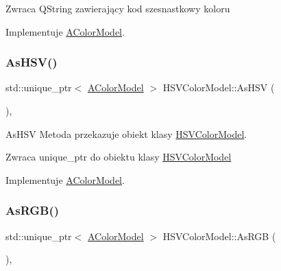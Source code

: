 \begin{DoxyReturn}{Zwraca}
Q\+String zawierający kod szesnastkowy koloru 
\end{DoxyReturn}


Implementuje \mbox{\hyperlink{class_a_color_model}{A\+Color\+Model}}.

\mbox{\label{class_h_s_v_color_model_a4f15c9e48f157f7bd83f5a0837f1ac87}} 
\subsubsection{\texorpdfstring{As\+H\+S\+V()}{AsHSV()}}
{\footnotesize\ttfamily std\+::unique\+\_\+ptr$<$ \mbox{\hyperlink{class_a_color_model}{A\+Color\+Model}} $>$ H\+S\+V\+Color\+Model\+::\+As\+H\+SV (\begin{DoxyParamCaption}{ }\end{DoxyParamCaption})\hspace{0.3cm}{\ttfamily [override]}, {\ttfamily [virtual]}}



As\+H\+SV Metoda przekazuje obiekt klasy \mbox{\hyperlink{class_h_s_v_color_model}{H\+S\+V\+Color\+Model}}. 

\begin{DoxyReturn}{Zwraca}
unique\+\_\+ptr do obiektu klasy \mbox{\hyperlink{class_h_s_v_color_model}{H\+S\+V\+Color\+Model}} 
\end{DoxyReturn}


Implementuje \mbox{\hyperlink{class_a_color_model}{A\+Color\+Model}}.

\mbox{\label{class_h_s_v_color_model_a576aa9888f81248c99e67da6bb0587d2}} 
\subsubsection{\texorpdfstring{As\+R\+G\+B()}{AsRGB()}}
{\footnotesize\ttfamily std\+::unique\+\_\+ptr$<$ \mbox{\hyperlink{class_a_color_model}{A\+Color\+Model}} $>$ H\+S\+V\+Color\+Model\+::\+As\+R\+GB (\begin{DoxyParamCaption}{ }\end{DoxyParamCaption})\hspace{0.3cm}{\ttfamily [override]}, {\ttfamily [virtual]}}



